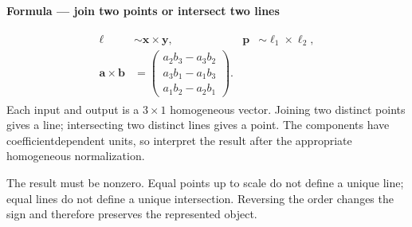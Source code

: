 \documentclass[letterpaper,11pt,english,openany,oneside]{jupyterBook}
\begin{document}
\begin{TextbookBox}
\textbf{Formula — join two points or intersect two lines}\par\smallskip
\begin{equation}\label{equation:lectures/lecture01/projective:eq-lec01-cross}
\begin{split}\begin{aligned}
\boldsymbol\ell&\sim\mathbf{x}\times\mathbf{y},&
\mathbf{p}&\sim\boldsymbol\ell_1\times\boldsymbol\ell_2,\\
\mathbf{a}\times\mathbf{b}
&=\begin{pmatrix}a_2b_3-a_3b_2\\a_3b_1-a_1b_3\\a_1b_2-a_2b_1\end{pmatrix}.
\end{aligned}\end{split}
\end{equation}
\sphinxAtStartPar
Each input and output is a \(3\times1\) homogeneous vector. Joining two distinct points gives a line; intersecting two distinct lines gives a point. The components have coefficient\sphinxhyphen{}dependent units, so interpret the result after the appropriate homogeneous normalization.

\sphinxAtStartPar
{} The result must be nonzero. Equal points up to scale do not define a unique line; equal lines do not define a unique intersection. Reversing the order changes the sign and therefore preserves the represented object.

\end{TextbookBox}
\end{document}
